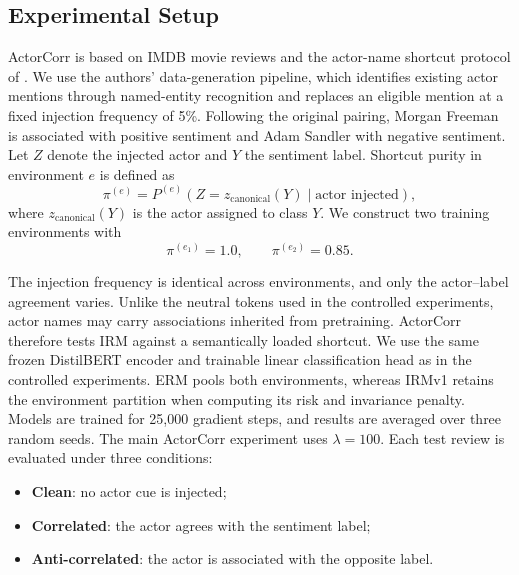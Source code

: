 \documentclass[11pt]{article}
\theoremstyle{definition}
\theoremstyle{plain}
\begin{document}
\subsection{Experimental Setup}
\label{app:actorcorr-setup}

ActorCorr is based on IMDB movie reviews and the actor-name shortcut protocol of \citet{eshuijs2025short}. We use the authors' data-generation pipeline, which identifies existing actor mentions through named-entity recognition and replaces an eligible mention at a fixed injection frequency of 5\%. Following the original pairing, Morgan Freeman is associated with positive sentiment and Adam Sandler with negative sentiment. Let $Z$ denote the injected actor and $Y$ the sentiment label. Shortcut purity in environment $e$ is defined as
\begin{equation} \pi^{(e)} = P^{(e)} \left(Z=z_{\mathrm{canonical}}(Y) \mid \text{actor injected}\right), \label{eq:actorcorr-purity}
\end{equation}
where $z_{\mathrm{canonical}}(Y)$ is the actor assigned to class $Y$. We construct two training environments with \begin{equation}
\pi^{(e_1)}=1.0, \qquad \pi^{(e_2)}=0.85.
\end{equation}

The injection frequency is identical across environments, and only the actor--label agreement varies. Unlike the neutral tokens used in the controlled experiments, actor names may carry associations inherited from pretraining. ActorCorr therefore tests IRM against a semantically loaded shortcut. We use the same frozen DistilBERT encoder and trainable linear classification head as in the controlled experiments. ERM pools both environments, whereas IRMv1 retains the environment partition when computing its risk and invariance penalty. Models are trained for 25,000 gradient steps, and results are averaged over three random seeds. The main ActorCorr experiment uses $\lambda=100$. Each test review is evaluated under three conditions:
\begin{itemize}
    \item \textbf{Clean}: no actor cue is injected;
    \item \textbf{Correlated}: the actor agrees with the sentiment label;
    \item \textbf{Anti-correlated}: the actor is associated with the opposite label.
\end{itemize}
\end{document}
